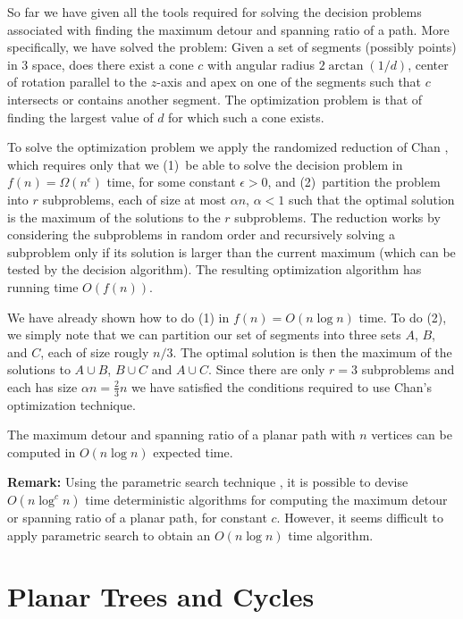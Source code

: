 \documentclass[lotsofwhite]{patmorin}
\begin{document}
So far we have given all the tools required for solving the decision
problems associated with finding the maximum detour and spanning ratio
of a path.  More specifically, we have solved the problem: Given a set
of segments (possibly points) in 3 space, does there exist a cone $c$
with angular radius $2\arctan(1/d)$, center of rotation parallel to
the $z$-axis and apex on one of the segments such that $c$ intersects
or contains another segment.  The optimization problem is that of
finding the largest value of $d$ for which such a cone exists.

To solve the optimization problem we apply the randomized reduction of
Chan \cite{c99}, which requires only that we (1)~be able to solve the
decision problem in $f(n)=\Omega(n^\epsilon)$ time, for some constant
$\epsilon>0$, and (2)~partition the problem into $r$ subproblems, each
of size at most $\alpha n$, $\alpha < 1$ such that the optimal
solution is the maximum of the solutions to the $r$ subproblems.  The
reduction works by considering the subproblems in random order and
recursively solving a subproblem only if its solution is larger than
the current maximum (which can be tested by the decision algorithm).
The resulting optimization algorithm has running time $O(f(n))$.

We have already shown how to do (1) in $f(n) = O(n\log n)$ time.  To
do (2), we simply note that we can partition our set of segments into
three sets $A$, $B$, and $C$, each of size rougly $n/3$.  The optimal
solution is then the maximum of the solutions to $A\cup B$, $B\cup C$
and $A\cup C$.  Since there are only $r=3$ subproblems and each has
size $\alpha n=\frac{2}{3}n$ we have satisfied the conditions required
to use Chan's optimization technique.

\begin{thm}
The maximum detour and spanning ratio of a planar path with $n$
vertices can be computed in $O(n\log n)$ expected time.
\end{thm}

\noindent\textbf{Remark:} Using the parametric search technique
\cite{m83}, it is possible to devise $O(n\log^c n)$ time deterministic
algorithms for computing the maximum detour or spanning ratio of a
planar path, for constant $c$.  However, it seems difficult to apply
parametric search to obtain an $O(n\log n)$ time algorithm.

\section{Planar Trees and Cycles}
\end{document}
